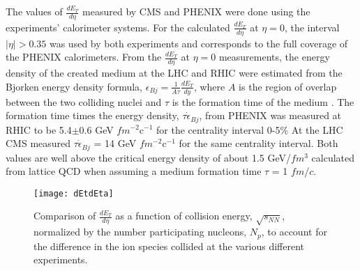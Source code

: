     The values of $\frac{dE_{T}}{d\eta}$ measured by CMS \cite{cmsEt} and PHENIX 
      \cite{phenixDeDeta} were done using the experiments' calorimeter 
      systems.
    For the calculated $\frac{dE_{T}}{d\eta}$ at $\eta = 0$, the interval 
      $|\eta| > 0.35$ was used by both experiments and corresponds to the full
      coverage of the PHENIX calorimeters. 
    From the $\frac{dE_{T}}{d\eta}$ at $\eta = 0$ measurements, the energy 
      density of the created medium at the LHC and RHIC were estimated from the
      Bjorken energy density formula, 
    $\epsilon_{Bj}=\frac{1}{A\tau}\frac{dE_{T}}{dy}$, where $A$ is the region
      of overlap between the two colliding nuclei and $\tau$ is the formation
      time of the medium \cite{bjEdense}.
    The formation time times the energy density, $\tau\dot\epsilon_{Bj}$, 
      from PHENIX was measured at RHIC to be 5.4$\pm$0.6 GeV $fm$$^{-2}$c$^{-1}$ 
      for the centrality interval 0-5\% 
    At the LHC CMS measured $\tau\dot\epsilon_{Bj}$ = 14 GeV $fm$$^{-2}$c$^{-1}$ 
      for the same centrality interval.
    Both values are well above the critical energy density of about 1.5 GeV/$fm$$^{3}$ 
      calculated from lattice QCD when assuming a medium formation time $\tau$ 
      = 1 $fm$/$c$.
      \begin{figure}[!Hhbt]
        \centering
        \texttt{[image: dEtdEta]}
        \caption{Comparison of $\frac{dE_{T}}{d\eta}$ as a function of 
          collision energy, $\sqrt{s_{NN}}$, normalized by the number 
          participating nucleons, $N_{p}$, to account for the difference in 
          the ion species collided at the various different experiments.}
        \label{fig:dEtdEta}
      \end{figure}

